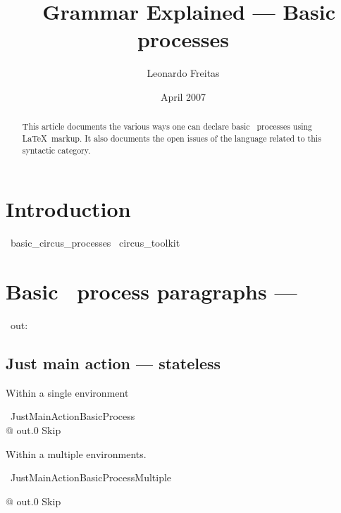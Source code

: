 \documentclass{article}
\begin{document}
\title{\Circus\ Grammar Explained --- Basic processes}
\author{Leonardo Freitas}
\date{April 2007}

\maketitle

\begin{abstract}
    \noindent This article documents the various ways one can declare basic \Circus\ processes using \LaTeX\ markup.
    It also documents the open issues of the language related to this syntactic category.
\end{abstract}

\section{Introduction}

\begin{zsection}
  \SECTION\ basic\_circus\_processes \parents\ circus\_toolkit
\end{zsection}

\section{Basic \Circus\ process paragraphs --- }

\begin{circus}
    \circchannel\ out: \nat
\end{circus}

\subsection{Just main action --- stateless}

Within a single environment
%
\begin{circus}
    \circprocess\ JustMainActionBasicProcess ~~\circdef~~ \circbegin \\
    @ out.0 \then Skip \\
    \circend
\end{circus}

Within a multiple environments.
%
\begin{circus}
    \circprocess\ JustMainActionBasicProcessMultiple ~~\circdef~~ \circbegin
\end{circus}

\begin{circusaction}
    @ out.0 \then Skip \\
\end{circusaction}
\end{document}
